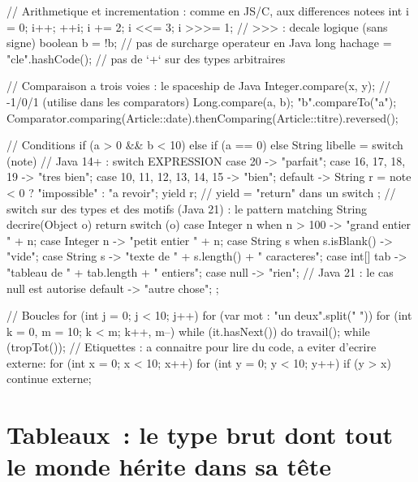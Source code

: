 \documentclass[12pt,a4paper,twoside,openright]{book}
\begin{document}
\begin{codejava}
// Arithmetique et incrementation : comme en JS/C, aux differences notees
int i = 0; i++; ++i; i += 2; i <<= 3; i >>>= 1;         // >>> : decale logique (sans signe)
boolean b = !b;                                         // pas de surcharge operateur en Java
long hachage = "cle".hashCode();                        // pas de `+` sur des types arbitraires

// Comparaison a trois voies : le spaceship de Java
Integer.compare(x, y);                                  // -1/0/1 (utilise dans les comparators)
Long.compare(a, b);
"b".compareTo("a");
Comparator.comparing(Article::date).thenComparing(Article::titre).reversed();

// Conditions
if (a > 0 && b < 10) { } else if (a == 0) { } else { }
String libelle = switch (note) {                        // Java 14+ : switch EXPRESSION
    case 20 -> "parfait";
    case 16, 17, 18, 19 -> "tres bien";
    case 10, 11, 12, 13, 14, 15 -> "bien";
    default -> {
        String r = note < 0 ? "impossible" : "a revoir";
        yield r;                                        // yield = "return" dans un switch
    }
};
// switch sur des types et des motifs (Java 21) : le pattern matching
String decrire(Object o) {
    return switch (o) {
        case Integer n when n > 100 -> "grand entier " + n;
        case Integer n -> "petit entier " + n;
        case String s when s.isBlank() -> "vide";
        case String s -> "texte de " + s.length() + " caracteres";
        case int[] tab -> "tableau de " + tab.length + " entiers";
        case null -> "rien";                             // Java 21 : le cas null est autorise
        default -> "autre chose";
    };
}

// Boucles
for (int j = 0; j < 10; j++) { }
for (var mot : "un deux".split(" ")) { }
for (int k = 0, m = 10; k < m; k++, m--) { }
while (it.hasNext()) { }
do { travail(); } while (tropTot());
// Etiquettes : a connaitre pour lire du code, a eviter d'ecrire
externe: for (int x = 0; x < 10; x++) { for (int y = 0; y < 10; y++) { if (y > x) continue externe; } }
\end{codejava}

\section{Tableaux~: le type brut dont tout le monde h\'erite dans sa t\^ete}
\end{document}
